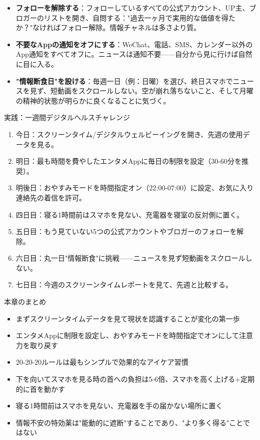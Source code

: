 \begin{itemize}
  \item \textbf{フォローを解除する}：フォローしているすべての公式アカウント、UP主、ブロガーのリストを開き、自問する："過去一ヶ月で実用的な価値を得たか？"なければフォロー解除。情報チャネルは多さより質。
  \item \textbf{不要なAppの通知をオフにする}：WeChat、電話、SMS、カレンダー以外のApp通知をすべてオフに。ニュースは通知不要——自分から見に行けば自然に目に入る。
  \item \textbf{"情報断食日"を設ける}：毎週一日（例：日曜）を選び、終日スマホでニュースを見ず、短動画をスクロールしない。空が崩れ落ちないこと、そして月曜の精神的状態が明らかに良くなることに気づく。
\end{itemize}

\begin{tcbpractice}{実践：一週間デジタルヘルスチャレンジ}
\begin{enumerate}
  \item 今日：スクリーンタイム/デジタルウェルビーイングを開き、先週の使用データを見る。
  \item 明日：最も時間を費やしたエンタメAppに毎日の制限を設定（30-60分を推奨）。
  \item 明後日：おやすみモードを時間指定オン（22:00-07:00）に設定、お気に入り連絡先の着信を許可。
  \item 四日目：寝る1時間前はスマホを見ない、充電器を寝室の反対側に置く。
  \item 五日目：もう見ていない5つの公式アカウントやブロガーのフォローを解除。
  \item 六日目：丸一日"情報断食"に挑戦——ニュースを見ず短動画をスクロールしない。
  \item 七日目：今週のスクリーンタイムレポートを見て、先週と比較する。
\end{enumerate}

\end{tcbpractice}

\begin{tcbsummary}{本章のまとめ}
\begin{itemize}
  \item まずスクリーンタイムデータを見て現状を認識することが変化の第一歩
  \item エンタメAppに制限を設定し、おやすみモードを時間指定でオンにして注意力を取り戻す
  \item 20-20-20ルールは最もシンプルで効果的なアイケア習慣
  \item 下を向いてスマホを見る時の首への負担は5-6倍、スマホを高く上げる+定期的に首を動かす
  \item 寝る1時間前はスマホを見ない、充電器を手の届かない場所に置く
  \item 情報不安の特効薬は"能動的に遮断"することであり、"より多く得る"ことではない
\end{itemize}

\end{tcbsummary}
